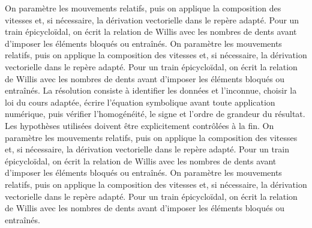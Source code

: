 \begin{corrigebox}[Corrigé]
On paramètre les mouvements relatifs, puis on applique la composition des vitesses et, si nécessaire, la dérivation vectorielle dans le repère adapté. Pour un train épicycloïdal, on écrit la relation de Willis avec les nombres de dents avant d'imposer les éléments bloqués ou entraînés.
On paramètre les mouvements relatifs, puis on applique la composition des vitesses et, si nécessaire, la dérivation vectorielle dans le repère adapté. Pour un train épicycloïdal, on écrit la relation de Willis avec les nombres de dents avant d'imposer les éléments bloqués ou entraînés.
La résolution consiste à identifier les données et l'inconnue, choisir la loi du cours adaptée, écrire l'équation symbolique avant toute application numérique, puis vérifier l'homogénéité, le signe et l'ordre de grandeur du résultat. Les hypothèses utilisées doivent être explicitement contrôlées à la fin.
On paramètre les mouvements relatifs, puis on applique la composition des vitesses et, si nécessaire, la dérivation vectorielle dans le repère adapté. Pour un train épicycloïdal, on écrit la relation de Willis avec les nombres de dents avant d'imposer les éléments bloqués ou entraînés.
On paramètre les mouvements relatifs, puis on applique la composition des vitesses et, si nécessaire, la dérivation vectorielle dans le repère adapté. Pour un train épicycloïdal, on écrit la relation de Willis avec les nombres de dents avant d'imposer les éléments bloqués ou entraînés.
\end{corrigebox}
